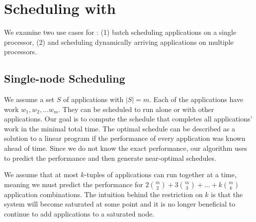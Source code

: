 \section{Scheduling with \SYSTEM{}}
\label{section:scheduling}
We examine two use cases for \SYSTEM{}: (1) batch scheduling
applications on a single processor, (2) and scheduling dynamically
arriving applications on multiple processors.

\subsection{Single-node Scheduling}
\label{sec:single_proc}
We assume a set $S$ of applications with $|S| = m$. Each of the
applications have work $w_1, w_2,. . .  w_m$. They can be scheduled to
run alone or with other applications.  Our goal is to compute the
schedule that completes all applications' work in the minimal total
time.  The optimal schedule can be described as a solution to a linear
program if the performance of every application was known ahead of
time. Since we do not know the exact performance, our algorithm uses
\SYSTEM{} to predict the performance and then generate near-optimal
schedules.

We assume that at most $k$-tuples of applications can run together at
a time, meaning we must predict the performance for $2\binom{m}{2} +
3\binom{m}{3} + \ldots + k\binom{m}{k}$ application combinations.  The
intuition behind the restriction on $k$ is that the system will become
saturated at some point and it is no longer beneficial to continue to
add applications to a saturated node.


